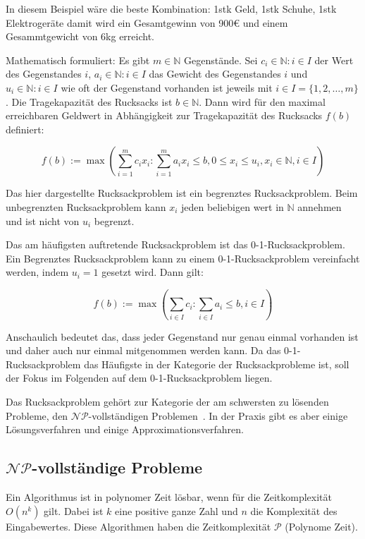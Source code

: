 \documentclass[12pt, a4paper, ngerman]{article}
\newcommand{\natnums}{\ensuremath{\mathbb{N}}}
\begin{document}
In diesem Beispiel wäre die beste Kombination: 1stk Geld, 1stk Schuhe, 1stk Elektrogeräte
damit wird ein Gesamtgewinn von 900€ und einem Gesammtgewicht von 6kg erreicht.

Mathematisch formuliert: Es gibt \(m\in\natnums\) Gegenstände.
Sei \(c_i\in\natnums : i\in I\) der Wert des Gegenstandes \(i\),
\(a_i\in\natnums : i\in I\) das Gewicht des Gegenstandes \(i\)
und \(u_i\in \natnums : i\in I\) wie oft der Gegenstand vorhanden ist jeweils mit \(i\in I = \{1 ,2 ,\ldots ,m\} \).
Die Tragekapazität des Rucksacks ist \(b\in\natnums\).
Dann wird für den maximal erreichbaren Geldwert in Abhängigkeit zur Tragekapazität des Rucksacks \(f(b)\) definiert:

\[
  f(b):=\max(\sum_{i=1}^m c_i x_i : \sum_{i=1}^m a_i x_i\leq b, 0\leq x_i\leq u_i,  x_i\in\natnums, i\in I)
\]

Das hier dargestellte Rucksackproblem ist ein begrenztes Rucksackproblem.
Beim unbegrenzten Rucksackproblem kann \(x_i\) jeden beliebigen wert in \(\natnums \) annehmen und ist nicht von \(u_i\) begrenzt.

Das am häufigsten auftretende Rucksackproblem ist das 0-1-Rucksackproblem.
Ein Begrenztes Rucksackproblem kann zu einem 0-1-Rucksackproblem vereinfacht werden, indem \(u_i=1\) gesetzt wird. Dann gilt:

\[
  f(b):=\max(\sum_{i\in I}c_i : \sum_{i\in I}a_i\leq b, i\in I)
\]

Anschaulich bedeutet das, dass jeder Gegenstand nur genau einmal vorhanden ist
und daher auch nur einmal mitgenommen werden kann.
Da das 0-1-Rucksackproblem das Häufigste in der Kategorie der Rucksackprobleme ist,
soll der Fokus im Folgenden auf dem 0-1-Rucksackproblem liegen.

Das Rucksackproblem gehört zur Kategorie der am schwersten zu lösenden Probleme,
den \(\mathcal{NP}\)-vollständigen Problemen~\cite{mainKnapsack}.
In der Praxis gibt es aber einige Lösungsverfahren und einige Approximationsverfahren.

\subsection{\(\mathcal{NP}\)-vollständige Probleme}

Ein Algorithmus ist in polynomer Zeit lösbar,
wenn für die Zeitkomplexität \(O(n^k)\) gilt.
Dabei ist \(k\) eine positive ganze Zahl und \(n\) die Komplexität des Eingabewertes.
Diese Algorithmen haben die Zeitkomplexität \(\mathcal{P}\) (Polynome Zeit).
\end{document}
